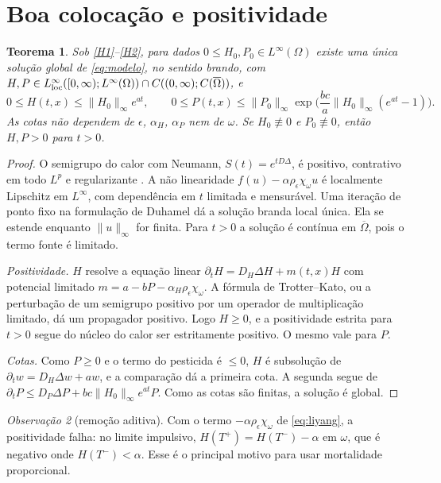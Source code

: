 \documentclass[11pt,a4paper]{article}
\numberwithin{equation}{section}
\newtheorem{teorema}{Teorema}[section]
\theoremstyle{definition}
\theoremstyle{remark}
\newtheorem{observacao}[teorema]{Observação}
\begin{document}
\section{Boa colocação e positividade}

\begin{teorema}\label{teo:existencia}
Sob \ref{H1}--\ref{H2}, para dados $0\le H_0,P_0\in L^\infty(\Omega)$ existe uma única solução
global de \eqref{eq:modelo}, no sentido brando, com
$H,P\in L^\infty_{\rm loc}([0,\infty);L^\infty(\Omega))\cap C((0,\infty);C(\overline\Omega))$, e
\begin{equation}\label{eq:cotas}
0\le H(t,x)\le\|H_0\|_\infty e^{at},\qquad
0\le P(t,x)\le\|P_0\|_\infty\exp\!\Big(\frac{bc}a\|H_0\|_\infty(e^{at}-1)\Big).
\end{equation}
As cotas não dependem de $\epsilon$, $\alpha_H$, $\alpha_P$ nem de $\omega$. Se $H_0\not\equiv0$ e
$P_0\not\equiv0$, então $H,P>0$ para $t>0$.
\end{teorema}

\begin{proof}
O semigrupo do calor com Neumann, $S(t)=e^{tD\Delta}$, é positivo, contrativo em todo $L^p$ e
regularizante \cite{Henry,Pazy,QS}. A não linearidade
$f(u)-\alpha\rho_\epsilon\chi_\omega u$ é localmente Lipschitz em $L^\infty$, com dependência em $t$
limitada e mensurável. Uma iteração de ponto fixo na formulação de Duhamel dá a solução branda
local única. Ela se estende enquanto $\|u\|_\infty$ for finita. Para $t>0$ a solução é contínua
em $\overline\Omega$, pois o termo fonte é limitado.

\emph{Positividade.} $H$ resolve a equação linear $\partial_tH=D_H\Delta H+m(t,x)H$ com potencial
limitado $m=a-bP-\alpha_H\rho_\epsilon\chi_\omega$. A fórmula de Trotter--Kato, ou a
perturbação de um semigrupo positivo por um operador de multiplicação limitado, dá um propagador
positivo. Logo $H\ge0$, e a positividade estrita para $t>0$ segue do núcleo do calor ser
estritamente positivo. O mesmo vale para $P$.

\emph{Cotas.} Como $P\ge0$ e o termo do pesticida é $\le0$, $H$ é subsolução de
$\partial_t w=D_H\Delta w+aw$, e a comparação dá a primeira cota. A segunda segue de
$\partial_tP\le D_P\Delta P+bc\|H_0\|_\infty e^{at}P$. Como as cotas são finitas, a solução é
global.
\end{proof}

\begin{observacao}[remoção aditiva]\label{obs:aditiva}
Com o termo $-\alpha\rho_\epsilon\chi_\omega$ de \eqref{eq:liyang}, a positividade falha: no limite
impulsivo, $H(T^+)=H(T^-)-\alpha$ em $\omega$, que é negativo onde $H(T^-)<\alpha$. Esse é o
principal motivo para usar mortalidade proporcional.
\end{observacao}
\end{document}
